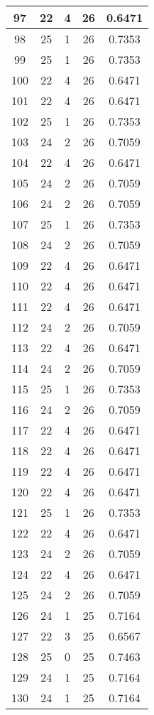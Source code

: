 \documentclass[letterpaper, 12pt]{article}
\begin{document}
\begin{longtable}{|c|c|c|c|c|}
\hline
97 & 22 & 4 & 26 & 0.6471 \\
\hline
98 & 25 & 1 & 26 & 0.7353 \\
\hline
99 & 25 & 1 & 26 & 0.7353 \\
\hline
100 & 22 & 4 & 26 & 0.6471 \\
\hline
101 & 22 & 4 & 26 & 0.6471 \\
\hline
102 & 25 & 1 & 26 & 0.7353 \\
\hline
103 & 24 & 2 & 26 & 0.7059 \\
\hline
104 & 22 & 4 & 26 & 0.6471 \\
\hline
105 & 24 & 2 & 26 & 0.7059 \\
\hline
106 & 24 & 2 & 26 & 0.7059 \\
\hline
107 & 25 & 1 & 26 & 0.7353 \\
\hline
108 & 24 & 2 & 26 & 0.7059 \\
\hline
109 & 22 & 4 & 26 & 0.6471 \\
\hline
110 & 22 & 4 & 26 & 0.6471 \\
\hline
111 & 22 & 4 & 26 & 0.6471 \\
\hline
112 & 24 & 2 & 26 & 0.7059 \\
\hline
113 & 22 & 4 & 26 & 0.6471 \\
\hline
114 & 24 & 2 & 26 & 0.7059 \\
\hline
115 & 25 & 1 & 26 & 0.7353 \\
\hline
116 & 24 & 2 & 26 & 0.7059 \\
\hline
117 & 22 & 4 & 26 & 0.6471 \\
\hline
118 & 22 & 4 & 26 & 0.6471 \\
\hline
119 & 22 & 4 & 26 & 0.6471 \\
\hline
120 & 22 & 4 & 26 & 0.6471 \\
\hline
121 & 25 & 1 & 26 & 0.7353 \\
\hline
122 & 22 & 4 & 26 & 0.6471 \\
\hline
123 & 24 & 2 & 26 & 0.7059 \\
\hline
124 & 22 & 4 & 26 & 0.6471 \\
\hline
125 & 24 & 2 & 26 & 0.7059 \\
\hline
126 & 24 & 1 & 25 & 0.7164 \\
\hline
127 & 22 & 3 & 25 & 0.6567 \\
\hline
128 & 25 & 0 & 25 & 0.7463 \\
\hline
129 & 24 & 1 & 25 & 0.7164 \\
\hline
130 & 24 & 1 & 25 & 0.7164 \\

\end{longtable}
\end{document}
